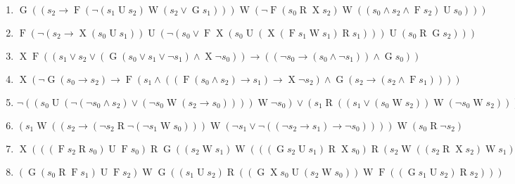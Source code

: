 \begin{footnotesize}
\begin{enumerate}[leftmargin=0.5cm]
\item $\mathop{G}((s_2 \mathrel{\rightarrow} \mathop{F}(\mathop{\neg}(s_1 \mathrel{U} s_2) \mathrel{W} (s_2 \mathrel{\vee} \mathop{G}s_1))) \mathrel{W} (\mathop{\neg}\mathop{F}(s_0 \mathrel{R} \mathop{X}s_2) \mathrel{W} ((s_0 \mathrel{\wedge} s_2 \mathrel{\wedge} \mathop{F}s_2) \mathrel{U} s_0)))$
\item $\mathop{F}(\mathop{\neg}(s_2 \mathrel{\rightarrow} \mathop{X}(s_0 \mathrel{U} s_1)) \mathrel{U} (\mathop{\neg}(s_0 \mathrel{\vee} \mathop{F}\mathop{X}(s_0 \mathrel{U} (\mathop{X}(\mathop{F}s_1 \mathrel{W} s_1) \mathrel{R} s_1))) \mathrel{U} (s_0 \mathrel{R} \mathop{G}s_2)))$
\item $\mathop{X}\mathop{F}((s_1 \mathrel{\vee} s_2 \mathrel{\vee} (\mathop{G}(s_0 \mathrel{\vee} s_1 \mathrel{\vee} \mathop{\neg}s_1) \mathrel{\wedge} \mathop{X}\mathop{\neg}s_0)) \mathrel{\rightarrow} ((\mathop{\neg}s_0 \mathrel{\rightarrow} (s_0 \mathrel{\wedge} \mathop{\neg}s_1)) \mathrel{\wedge} \mathop{G}s_0))$
\item $\mathop{X}(\mathop{\neg}\mathop{G}(s_0 \mathrel{\rightarrow} s_2) \mathrel{\rightarrow} \mathop{F}(s_1 \mathrel{\wedge} ((\mathop{F}(s_0 \mathrel{\wedge} s_2) \mathrel{\rightarrow} s_1) \mathrel{\rightarrow} \mathop{X}\mathop{\neg}s_2) \mathrel{\wedge} \mathop{G}(s_2 \mathrel{\rightarrow} (s_2 \mathrel{\wedge} \mathop{F}s_1))))$
\item $\mathop{\neg}((s_0 \mathrel{U} (\mathop{\neg}(\mathop{\neg}s_0 \mathrel{\wedge} s_2) \mathrel{\vee} (\mathop{\neg}s_0 \mathrel{W} (s_2 \mathrel{\rightarrow} s_0)))) \mathrel{W} \mathop{\neg}s_0) \mathrel{\vee} (s_1 \mathrel{R} ((s_1 \mathrel{\vee} (s_0 \mathrel{W} s_2)) \mathrel{W} (\mathop{\neg}s_0 \mathrel{W} s_2)))$
\item $(s_1 \mathrel{W} ((s_2 \mathrel{\rightarrow} (\mathop{\neg}s_2 \mathrel{R} \mathop{\neg}(\mathop{\neg}s_1 \mathrel{W} s_0))) \mathrel{W} (\mathop{\neg}s_1 \mathrel{\vee} \mathop{\neg}((\mathop{\neg}s_2 \mathrel{\rightarrow} s_1) \mathrel{\rightarrow} \mathop{\neg}s_0)))) \mathrel{W} (s_0 \mathrel{R} \mathop{\neg}s_2)$
\item $\mathop{X}(((\mathop{F}s_2 \mathrel{R} s_0) \mathrel{U} \mathop{F}s_0) \mathrel{R} \mathop{G}((s_2 \mathrel{W} s_1) \mathrel{W} (((\mathop{G}s_2 \mathrel{U} s_1) \mathrel{R} \mathop{X}s_0) \mathrel{R} (s_2 \mathrel{W} ((s_2 \mathrel{R} \mathop{X}s_2) \mathrel{W} s_1)))))$
\item $(\mathop{G}(s_0 \mathrel{R} \mathop{F}s_1) \mathrel{U} \mathop{F}s_2) \mathrel{W} \mathop{G}((s_1 \mathrel{U} s_2) \mathrel{R} ((\mathop{G}\mathop{X}s_0 \mathrel{U} (s_2 \mathrel{W} s_0)) \mathrel{W} \mathop{F}((\mathop{G}s_1 \mathrel{U} s_2) \mathrel{R} s_2)))$

\end{enumerate}
\end{footnotesize}
